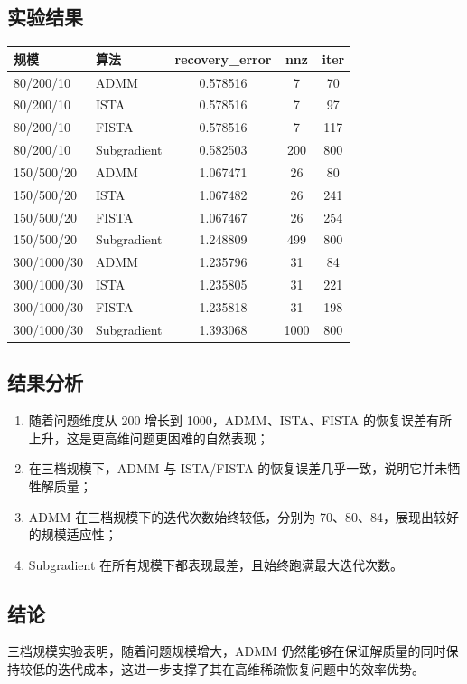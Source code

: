 \documentclass[12pt,a4paper]{ctexart}
\begin{document}
\subsection{实验结果}
\begin{center}
\begin{tabular}{llccc}
\toprule
规模 & 算法 & recovery\_error & nnz & iter \\
\midrule
80/200/10 & ADMM & 0.578516 & 7 & 70 \\
80/200/10 & ISTA & 0.578516 & 7 & 97 \\
80/200/10 & FISTA & 0.578516 & 7 & 117 \\
80/200/10 & Subgradient & 0.582503 & 200 & 800 \\
\midrule
150/500/20 & ADMM & 1.067471 & 26 & 80 \\
150/500/20 & ISTA & 1.067482 & 26 & 241 \\
150/500/20 & FISTA & 1.067467 & 26 & 254 \\
150/500/20 & Subgradient & 1.248809 & 499 & 800 \\
\midrule
300/1000/30 & ADMM & 1.235796 & 31 & 84 \\
300/1000/30 & ISTA & 1.235805 & 31 & 221 \\
300/1000/30 & FISTA & 1.235818 & 31 & 198 \\
300/1000/30 & Subgradient & 1.393068 & 1000 & 800 \\
\bottomrule
\end{tabular}
\end{center}

\subsection{结果分析}
\begin{enumerate}[label=\arabic*.]
    \item 随着问题维度从 200 增长到 1000，ADMM、ISTA、FISTA 的恢复误差有所上升，这是更高维问题更困难的自然表现；
    \item 在三档规模下，ADMM 与 ISTA/FISTA 的恢复误差几乎一致，说明它并未牺牲解质量；
    \item ADMM 在三档规模下的迭代次数始终较低，分别为 70、80、84，展现出较好的规模适应性；
    \item Subgradient 在所有规模下都表现最差，且始终跑满最大迭代次数。
\end{enumerate}

\subsection{结论}
三档规模实验表明，随着问题规模增大，ADMM 仍然能够在保证解质量的同时保持较低的迭代成本，这进一步支撑了其在高维稀疏恢复问题中的效率优势。
\end{document}
